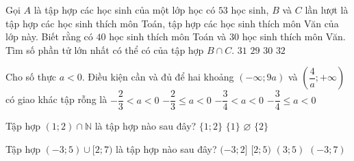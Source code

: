 \begin{ex}%
	Gọi $A$ là tập hợp các học sinh của một lớp học có $53$ học sinh, $B$ và $C$ lần lượt là tập hợp các học sinh thích môn Toán, tập hợp các học sinh thích môn Văn của lớp này. Biết rằng có $40$ học sinh thích môn Toán và $30$ học sinh thích môn Văn. Tìm số phần tử lớn nhất có thể có của tập hợp $B\cap C$.
	\choice
	{$31$}
	{$29$}
	{\True $30$}
	{$32$}
\end{ex}
\begin{ex}%
	Cho số thực $a<0$. Điều kiện cần và đủ để hai khoảng $\left(-\infty;9a\right)$ và $\left(\dfrac{4}{a};+\infty\right)$ có giao khác tập rỗng là
	\choice
	{\True$-\dfrac{2}{3}<a<0$}
	{$-\dfrac{2}{3}\le a<0$}
	{$-\dfrac{3}{4}<a<0$}
	{$-\dfrac{3}{4}\le a<0$}
\end{ex}
\begin{ex}%
	Tập hợp $(1;2)\cap\mathbb{N}$ là tập hợp nào sau đây?
	\choice
	{$\{1;2\}$}
	{$\{1\}$}
	{\True $\varnothing$}
	{$\{2\}$}
\end{ex}	
\begin{ex}%
	Tập hợp $(-3;5)\cup[2;7)$ là tập hợp nào sau đây?		
	\choice
	{$(-3;2]$}
	{$[2;5)$}
	{$(3;5)$}
	{\True $(-3;7)$}	
	\loigiai{
		Ta có $(-3;5)\cup [2;7)=(-3;7)$.
	}
\end{ex}	
